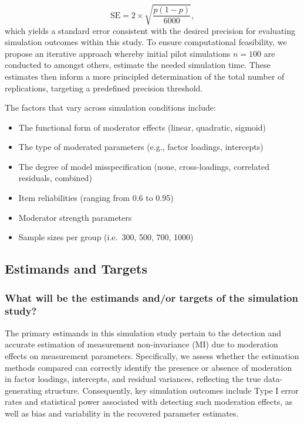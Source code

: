 \documentclass[
  man,
  floatsintext]{apa7}
\providecommand{\tightlist}{%
  \setlength{\itemsep}{0pt}\setlength{\parskip}{0pt}}
\begin{document}
\[
\text{SE} = 2 \times \sqrt{\frac{p(1-p)}{6000}},
\] which yields a standard error consistent with the desired precision
for evaluating simulation outcomes within this study. To ensure
computational feasibility, we propose an iterative approach whereby
initial pilot simulations \(n=100\) are conducted to amongst others,
estimate the needed simulation time. These estimates then inform a more
principled determination of the total number of replications, targeting
a predefined precision threshold.

The factors that vary across simulation conditions include:

\begin{itemize}
\tightlist
\item
  The functional form of moderator effects (linear, quadratic, sigmoid)
\item
  The type of moderated parameters (e.g., factor loadings, intercepts)
\item
  The degree of model misspecification (none, cross-loadings, correlated
  residuals, combined)
\item
  Item reliabilities (ranging from 0.6 to 0.95)
\item
  Moderator strength parameters
\item
  Sample sizes per group (i.e.~300, 500, 700, 1000)
\end{itemize}

\subsection{Estimands and Targets}\label{estimands-and-targets}

\subsubsection{What will be the estimands and/or targets of the
simulation
study?}\label{what-will-be-the-estimands-andor-targets-of-the-simulation-study}

The primary estimands in this simulation study pertain to the detection
and accurate estimation of measurement non-invariance (MI) due to
moderation effects on measurement parameters. Specifically, we assess
whether the estimation methods compared can correctly identify the
presence or absence of moderation in factor loadings, intercepts, and
residual variances, reflecting the true data-generating structure.
Consequently, key simulation outcomes include Type I error rates and
statistical power associated with detecting such moderation effects, as
well as bias and variability in the recovered parameter estimates.
\end{document}
